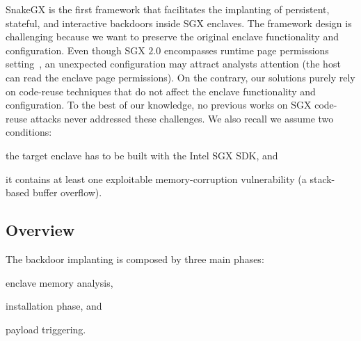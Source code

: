 SnakeGX is the first framework that facilitates the implanting of persistent, 
stateful, and interactive backdoors inside SGX enclaves.
The framework design is challenging because we want to preserve the original
enclave functionality and configuration.
Even though SGX $2.0$ encompasses runtime page permissions 
setting~\citep{intel-sgx2}, an unexpected configuration may attract analysts 
attention (\ie the host can read the enclave page permissions).
On the contrary, our solutions purely rely on code-reuse techniques that do not
affect the enclave functionality and configuration.
To the best of our knowledge, no previous works on SGX code-reuse attacks
never addressed these challenges.
We also recall we assume two conditions:
\begin{enumerate*}[label=(\roman*)]
	\item the target enclave has to be built with the Intel SGX SDK, 
	and
	\item it contains at least one exploitable memory-corruption 
	vulnerability (\eg a stack-based buffer overflow).
\end{enumerate*}



\subsection{Overview}
\label{ssec:overview-attack}

The backdoor implanting is composed by three main phases:
\begin{enumerate*}[label=(\roman*)]
	\item enclave memory analysis,
	\item installation phase, and
	\item payload triggering.
\end{enumerate*}

